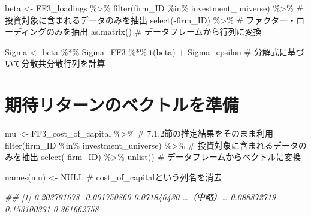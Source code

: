 \documentclass[
  letterpaper,
  DIV=11,
  numbers=noendperiod]{scrreprt}
\newenvironment{Shaded}{\begin{snugshade}}{\end{snugshade}}
\newcommand{\CommentTok}[1]{\textcolor[rgb]{0.37,0.37,0.37}{#1}}
\newcommand{\ConstantTok}[1]{\textcolor[rgb]{0.56,0.35,0.01}{#1}}
\newcommand{\DocumentationTok}[1]{\textcolor[rgb]{0.37,0.37,0.37}{\textit{#1}}}
\newcommand{\FunctionTok}[1]{\textcolor[rgb]{0.28,0.35,0.67}{#1}}
\newcommand{\NormalTok}[1]{\textcolor[rgb]{0.00,0.23,0.31}{#1}}
\newcommand{\OtherTok}[1]{\textcolor[rgb]{0.00,0.23,0.31}{#1}}
\newcommand{\SpecialCharTok}[1]{\textcolor[rgb]{0.37,0.37,0.37}{#1}}
\begin{document}
\begin{Shaded}
\begin{Highlighting}[]
\NormalTok{beta }\OtherTok{\textless{}{-}}\NormalTok{ FF3\_loadings }\SpecialCharTok{\%\textgreater{}\%}
  \FunctionTok{filter}\NormalTok{(firm\_ID }\SpecialCharTok{\%in\%}\NormalTok{ investment\_universe) }\SpecialCharTok{\%\textgreater{}\%} \CommentTok{\# 投資対象に含まれるデータのみを抽出}
  \FunctionTok{select}\NormalTok{(}\SpecialCharTok{{-}}\NormalTok{firm\_ID) }\SpecialCharTok{\%\textgreater{}\%} \CommentTok{\# ファクター・ローディングのみを抽出}
  \FunctionTok{as.matrix}\NormalTok{() }\CommentTok{\# データフレームから行列に変換}

\NormalTok{Sigma }\OtherTok{\textless{}{-}}\NormalTok{ beta }\SpecialCharTok{\%*\%}\NormalTok{ Sigma\_FF3 }\SpecialCharTok{\%*\%} \FunctionTok{t}\NormalTok{(beta) }\SpecialCharTok{+}\NormalTok{ Sigma\_epsilon }\CommentTok{\# 分解式に基づいて分散共分散行列を計算}
\end{Highlighting}
\end{Shaded}

\section{期待リターンのベクトルを準備}\label{ux671fux5f85ux30eaux30bfux30fcux30f3ux306eux30d9ux30afux30c8ux30ebux3092ux6e96ux5099}

\begin{Shaded}
\begin{Highlighting}[]
\NormalTok{mu }\OtherTok{\textless{}{-}}\NormalTok{ FF3\_cost\_of\_capital }\SpecialCharTok{\%\textgreater{}\%} \CommentTok{\# 7.1.2節の推定結果をそのまま利用}
  \FunctionTok{filter}\NormalTok{(firm\_ID }\SpecialCharTok{\%in\%}\NormalTok{ investment\_universe) }\SpecialCharTok{\%\textgreater{}\%} \CommentTok{\# 投資対象に含まれるデータのみを抽出}
  \FunctionTok{select}\NormalTok{(}\SpecialCharTok{{-}}\NormalTok{firm\_ID) }\SpecialCharTok{\%\textgreater{}\%}
  \FunctionTok{unlist}\NormalTok{() }\CommentTok{\# データフレームからベクトルに変換}

\FunctionTok{names}\NormalTok{(mu) }\OtherTok{\textless{}{-}} \ConstantTok{NULL} \CommentTok{\# cost\_of\_capitalという列名を消去}

\DocumentationTok{\#\#   [1]  0.203791678 {-}0.001750860  0.071846430  …（中略）…  0.088872719  0.153100331  0.361662758}
\end{Highlighting}
\end{Shaded}
\end{document}
